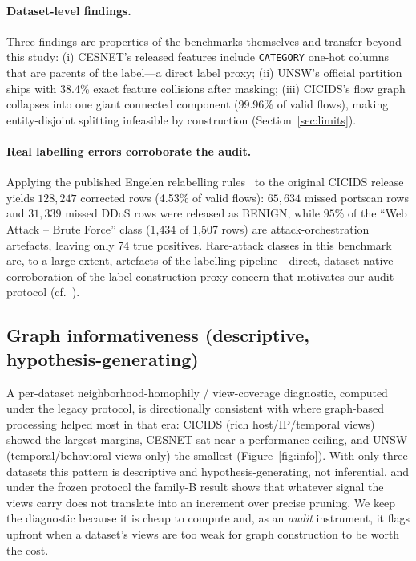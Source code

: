 \documentclass[pdflatex,referee,lineno,sn-basic,Numbered]{sn-jnl}
\begin{document}
\paragraph{Dataset-level findings.}
Three findings are properties of the benchmarks themselves and transfer beyond
this study: (i) CESNET's released features include \texttt{CATEGORY} one-hot
columns that are parents of the label---a direct label proxy; (ii) UNSW's
official partition ships with 38.4\% exact feature collisions after masking;
(iii) CICIDS's flow graph collapses into one giant connected component
(99.96\% of valid flows), making entity-disjoint splitting infeasible by
construction (Section~\ref{sec:limits}).

\paragraph{Real labelling errors corroborate the audit.}
Applying the published Engelen relabelling rules~\cite{liu2022error} to the
original CICIDS release yields $128{,}247$ corrected rows (4.53\% of valid
flows): $65{,}634$ missed portscan rows and $31{,}339$ missed DDoS rows were
released as BENIGN, while $95\%$ of the ``Web Attack -- Brute Force'' class
(1{,}434 of 1{,}507 rows) are attack-orchestration artefacts, leaving only 74
true positives. Rare-attack classes in this benchmark are, to a large extent,
artefacts of the labelling pipeline---direct, dataset-native corroboration of
the label-construction-proxy concern that motivates our audit protocol
(cf.~\cite{engelen2021troubleshooting,lanvin2023errors}).

\subsection{Graph informativeness (descriptive, hypothesis-generating)}
\label{sec:res-info}
A per-dataset neighborhood-homophily / view-coverage diagnostic, computed under
the legacy protocol, is directionally consistent with where graph-based
processing helped most in that era: CICIDS (rich host/IP/temporal views) showed
the largest margins, CESNET sat near a performance ceiling, and UNSW
(temporal/behavioral views only) the smallest
(Figure~\ref{fig:info}). With only three datasets this pattern is descriptive
and hypothesis-generating, not inferential, and under the frozen protocol the
family-B result shows that whatever signal the views carry does not translate
into an increment over precise pruning. We keep the diagnostic because it is
cheap to compute and, as an \emph{audit} instrument, it flags upfront when a
dataset's views are too weak for graph construction to be worth the cost.
\end{document}
